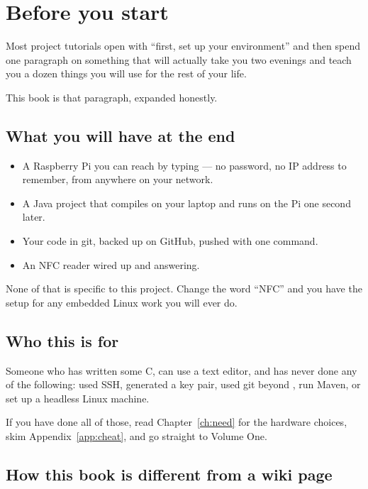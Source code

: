\chapter*{Before you start}

Most project tutorials open with ``first, set up your environment'' and then
spend one paragraph on something that will actually take you two evenings and
teach you a dozen things you will use for the rest of your life.

This book is that paragraph, expanded honestly.

\section*{What you will have at the end}

\begin{itemize}
  \item A Raspberry Pi you can reach by typing  --- no
        password, no IP address to remember, from anywhere on your network.
  \item A Java project that compiles on your laptop and runs on the Pi one
        second later.
  \item Your code in git, backed up on GitHub, pushed with one command.
  \item An NFC reader wired up and answering.
\end{itemize}

None of that is specific to this project. Change the word ``NFC'' and you have
the setup for any embedded Linux work you will ever do.

\section*{Who this is for}

Someone who has written some C, can use a text editor, and has never done any of
the following: used SSH, generated a key pair, used git beyond ,
run Maven, or set up a headless Linux machine.

If you have done all of those, read Chapter~\ref{ch:need} for the hardware
choices, skim Appendix~\ref{app:cheat}, and go straight to Volume One.

\section*{How this book is different from a wiki page}

